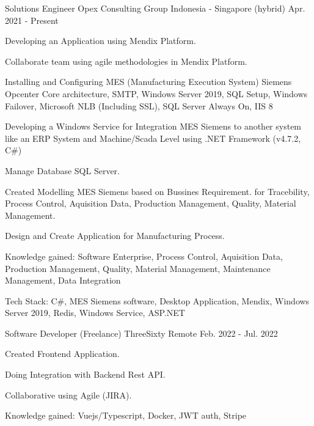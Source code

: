 \begin{cventries}
  \cventry
    {Solutions Engineer} %
    {Opex Consulting Group} %
    {Indonesia - Singapore (hybrid)} %
    {Apr. 2021 - Present} %
    {
      \begin{cvitems} %
        \item {Developing an Application using Mendix Platform.}
        \item {Collaborate team using agile methodologies in Mendix Platform.}
        \item {Installing and Configuring MES (Manufacturing Execution System) Siemens Opcenter Core architecture, SMTP, Windows Server 2019, SQL Setup, Windows Failover, Microsoft NLB (Including SSL), SQL Server Always On, IIS 8}
        \item {Developing a Windows Service for Integration MES Siemens to another system like an ERP System and Machine/Scada Level using .NET Framework (v4.7.2, C\#)}
        \item {Manage Database SQL Server.}
        \item {Created Modelling MES Siemens based on Bussines Requirement. for Tracebility, Process Control, Aquisition Data, Production Management, Quality, Material Management.}
        \item {Design and Create Application for Manufacturing Process.}
        \item {Knowledge gained: Software Enterprise, Process Control, Aquisition Data, Production Management, Quality, Material Management, Maintenance Management, Data Integration}
        \item {Tech Stack: C\#, MES Siemens software, Desktop Application, Mendix, Windows Server 2019, Redis, Windows Service, ASP.NET}
      \end{cvitems}
    }

  \cventry
    {Software Developer (Freelance)} %
    {ThreeSixty} %
    {Remote} %
    {Feb. 2022 - Jul. 2022} %
    {
      \begin{cvitems} %
        \item {Created Frontend Application.}
        \item {Doing Integration with Backend Rest API.}
        \item {Collaborative using Agile (JIRA).}
        \item {Knowledge gained: Vuejs/Typescript, Docker, JWT auth, Stripe}
      \end{cvitems}
    }
  


\end{cventries}
